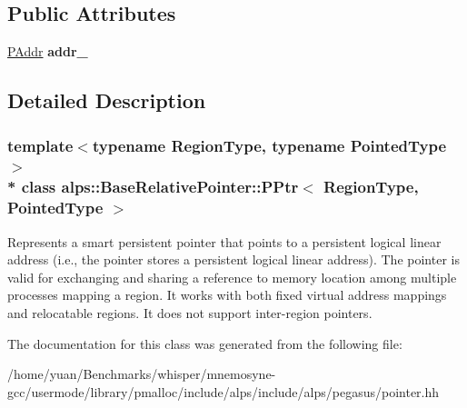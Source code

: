 \subsection*{Public Attributes}
\begin{DoxyCompactItemize}
\item 
\hyperlink{structalps_1_1PAddr}{P\+Addr} {\bfseries addr\+\_\+}\hypertarget{classalps_1_1BaseRelativePointer_1_1PPtr_a90eca717658a9ca6943ae4172393a759}{}\label{classalps_1_1BaseRelativePointer_1_1PPtr_a90eca717658a9ca6943ae4172393a759}

\end{DoxyCompactItemize}


\subsection{Detailed Description}
\subsubsection*{template$<$typename Region\+Type, typename Pointed\+Type$>$\\*
class alps\+::\+Base\+Relative\+Pointer\+::\+P\+Ptr$<$ Region\+Type, Pointed\+Type $>$}

Represents a smart persistent pointer that points to a persistent logical linear address (i.\+e., the pointer stores a persistent logical linear address). The pointer is valid for exchanging and sharing a reference to memory location among multiple processes mapping a region. It works with both fixed virtual address mappings and relocatable regions. It does not support inter-\/region pointers. 

The documentation for this class was generated from the following file\+:\begin{DoxyCompactItemize}
\item 
/home/yuan/\+Benchmarks/whisper/mnemosyne-\/gcc/usermode/library/pmalloc/include/alps/include/alps/pegasus/pointer.\+hh\end{DoxyCompactItemize}
